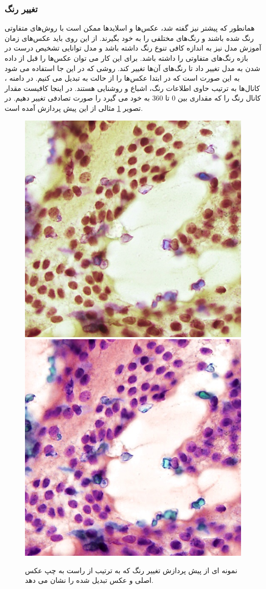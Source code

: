 \subsubsection{تغییر رنگ}
همانطور که پیشتر نیز گفته شد، عکس‌ها و اسلاید‌ها ممکن است با روش‌های متفاوتی رنگ شده باشند و رنگ‌های مختلفی را به خود بگیرند.
از این روی باید عکس‌های زمان آموزش مدل نیز به اندازه کافی تنوع رنگ داشته باشد و مدل توانایی تشخیص درست در بازه رنگ‌های متفاوتی را داشته باشد.
برای این کار می توان عکس‌ها را قبل از داده شدن به مدل تغییر داد تا رنگ‌های آن‌ها تغییر کند.
روشی که در این جا استفاده می شود به این صورت است که در ابتدا عکس‌ها را از حالت  به  تبدیل می کنیم.
در دامنه ، کانال‌ها به ترتیب حاوی اطلاعات رنگ، اشباع و روشنایی هستند.
در اینجا کافیست مقدار کانال رنگ را که مقداری بین 0 تا 360 به خود می گیرد را صورت تصادفی تغییر دهیم.
در تصویر \ref{jitter augmentation} مثالی از این پیش پردازش آمده است.
\begin{figure}
    \begin{center}
        \includegraphics[width=0.48\linewidth]{figs/suggested_methods/subs/data_augmentation/jitter_1054-original.jpeg}
        \includegraphics[width=0.48\linewidth]{figs/suggested_methods/subs/data_augmentation/jitter_1054-transformed.jpeg}
    \end{center}
    \caption{نمونه ای از پیش پردازش تغییر رنگ که به ترتیب از راست به چپ عکس اصلی و عکس تبدیل شده را نشان می دهد.}
    \label{jitter augmentation}
\end{figure}

